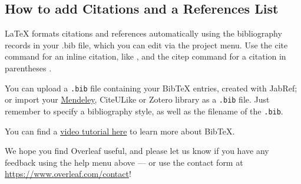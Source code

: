 \documentclass{article}
\begin{document}
\subsection*{How to add Citations and a References List}

LaTeX formats citations and references automatically using the bibliography records in your .bib file, which you can edit via the project menu. Use the cite command for an inline citation, like \cite{greenwade93}, and the citep command for a citation in parentheses \citep{lees2010theoretical}.

You can upload a \verb|.bib| file containing your BibTeX entries, created with JabRef; or import your \href{https://www.overleaf.com/blog/184}{Mendeley}, CiteULike or Zotero library as a \verb|.bib| file. Just remember to specify a bibliography style, as well as the filename of the \verb|.bib|.

You can find a \href{https://www.overleaf.com/help/97-how-to-include-a-bibliography-using-bibtex}{video tutorial here} to learn more about BibTeX.

We hope you find Overleaf useful, and please let us know if you have any feedback using the help menu above --- or use the contact form at \url{https://www.overleaf.com/contact}!
\end{document}
